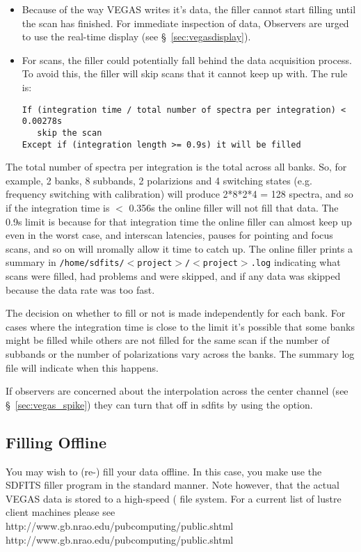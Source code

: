 \begin{itemize}[leftmargin=*]
\item Because of the way VEGAS writes it's data, the filler cannot start
filling until the scan has finished. For immediate inspection of data, 
Observers are urged to use the real-time display
(see \S~\ref{sec:vegasdisplay}).
\item For  scans, the filler could potentially fall behind the
data acquisition process. To avoid this, the filler will skip scans that
it cannot keep up with. The rule is:

\begin{verbatim}
If (integration time / total number of spectra per integration) < 0.00278s
   skip the scan
Except if (integration length >= 0.9s) it will be filled
\end{verbatim}
\end{itemize}


The total number of spectra per integration is the total across all banks. So, 
for example, 2 banks, 8 subbands, 2 polarizions and  4 switching states (e.g.
frequency switching with calibration) will produce 2*8*2*4 = 128 spectra, and
so if the integration time is $<$ 0.356s the online filler will not fill 
that data. The 0.9s limit is because for that integration time the online 
filler can almost keep up even in the worst case, and interscan latencies, 
pauses for pointing and focus scans, and so on will nromally allow it time 
to catch up. The online filler prints a summary
in {\tt /home/sdfits/$<$project$>$/$<$project$>$.log} indicating what scans were
filled, had problems and were skipped, and if any data was skipped because
the data rate was too fast.

The decision on whether to fill or not is made independently for each bank.
For cases where the integration time is close to the limit it's possible that 
some banks might be filled while others are not filled for the same scan 
if the number of subbands or the number of polarizations vary across the banks.  
The summary log file will indicate when this happens.

If observers are concerned about the interpolation across the center channel 
(see \S~\ref{sec:vegas_spike}) they can turn that off in sdfits by using the
 option.

 
\subsection{Filling Offline}\label{sec:vegas_sdfits_offline}
You may wish to (re-) fill your data offline. In this case, you make use
the SDFITS filler program in the standard manner.  Note however, that the
actual VEGAS data is stored to a high-speed ( file system.  For
a current list of lustre client machines please see\\  \htmladdnormallink
{http://www.gb.nrao.edu/pubcomputing/public.shtml}
{http://www.gb.nrao.edu/pubcomputing/public.shtml} 

